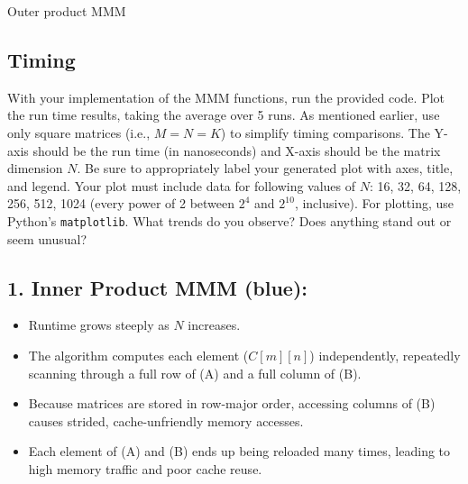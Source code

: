 \documentclass[a4 paper]{article}
\begin{document}
\begin{algorithm}[H]
\SetAlgoLined
\SetInd{0.25em}{0.5em}
\caption{Outer product MMM}
\label{algo:naivemm-kmn}
\end{algorithm}

\subsection*{Timing}
With your implementation of the MMM functions, run the provided code.
Plot the run time results, taking the average over 5 runs.
As mentioned earlier, use only square matrices (i.e., $M = N = K$) to simplify timing comparisons.
The Y-axis should be the run time (in nanoseconds) and X-axis should be the matrix dimension $N$.
Be sure to appropriately label your generated plot with axes, title, and legend.
Your plot must include data for following values of $N$: 16, 32, 64, 128, 256, 512, 1024 (every power of 2 between $2^4$ and $2^{10}$, inclusive).
For plotting, use Python’s \texttt{matplotlib}.
What trends do you observe?
Does anything stand out or seem unusual?



\subsection*{1. Inner Product MMM (blue):}
\begin{itemize}[noitemsep]
    \item Runtime grows steeply as $N$ increases.
    \item The algorithm computes each element ($C[m][n]$) independently, repeatedly scanning through a full row of (A) and a full column of (B).
    \item Because matrices are stored in row-major order, accessing columns of (B) causes strided, cache-unfriendly memory accesses.
    \item Each element of (A) and (B) ends up being reloaded many times, leading to high memory traffic and poor cache reuse.
\end{itemize}
\end{document}
